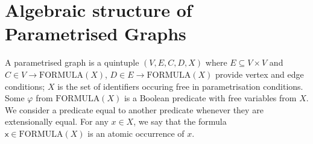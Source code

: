\section{Algebraic structure of Parametrised Graphs\label{sec:Algebra-of-parametrised}}

A parametrised graph is a quintuple $(V, E, C, D, X)$
where $E \subseteq V \times V$ and $C \in V \rightarrow \mathrm{FORMULA}(X)$, $D \in E \rightarrow \mathrm{FORMULA}(X)$ provide vertex and edge conditions; $X$ is the set of identifiers occuring free in parametrisation conditions. Some $\varphi$ from $\mathrm{FORMULA}(X)$ is a Boolean predicate with free variables from $X$. We consider a predicate equal to another predicate whenever they are extensionally equal. For any $x \in X$, we say that the formula $\mathsf{x} \in \mathrm{FORMULA}(X)$ is an atomic occurrence of $x$.

